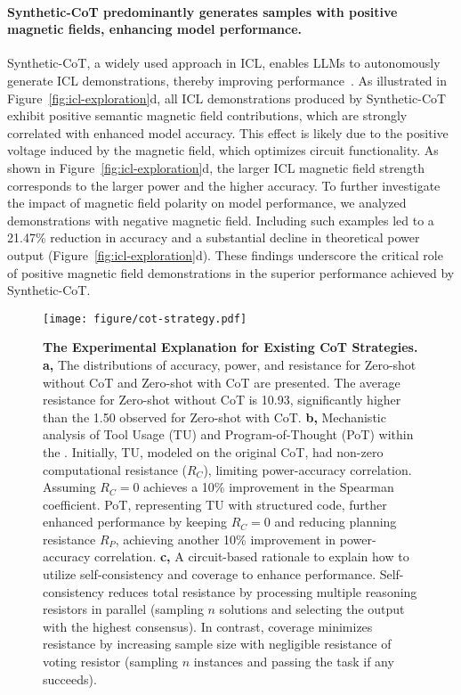 \paragraph{Synthetic-CoT predominantly generates samples with positive magnetic fields, enhancing model performance.}
Synthetic-CoT, a widely used approach in ICL, enables LLMs to autonomously generate ICL demonstrations, thereby improving performance~\citep{shao2023synthetic}. As illustrated in Figure~\ref{fig:icl-exploration}d, all ICL demonstrations produced by Synthetic-CoT exhibit positive semantic magnetic field contributions, which are strongly correlated with enhanced model accuracy. This effect is likely due to the positive voltage induced by the magnetic field, which optimizes circuit functionality. 
As shown in Figure~\ref{fig:icl-exploration}d, the larger ICL magnetic field strength corresponds to the larger power and the higher accuracy.
To further investigate the impact of magnetic field polarity on model performance, we analyzed demonstrations with negative magnetic field. Including such examples led to a 21.47\% reduction in accuracy and a substantial decline in theoretical power output (Figure~\ref{fig:icl-exploration}d). These findings underscore the critical role of positive magnetic field demonstrations in the superior performance achieved by Synthetic-CoT.

\begin{figure*}[t]
    \centering
    \texttt{[image: figure/cot-strategy.pdf]}
    \caption{
        \textbf{The Experimental Explanation for Existing CoT Strategies.}\\
        \textbf{a,}
        The distributions of accuracy, power, and resistance for Zero-shot without CoT and Zero-shot with CoT are presented. The average resistance for Zero-shot without CoT is 10.93, significantly higher than the 1.50 observed for Zero-shot with CoT.
        \textbf{b,}
        Mechanistic analysis of Tool Usage (TU) and Program-of-Thought (PoT) within the \modelname{}. Initially, TU, modeled on the original CoT, had non-zero computational resistance (\(R_C\)), limiting power-accuracy correlation. Assuming \(R_C = 0\) achieves a 10\% improvement in the Spearman coefficient.
        PoT, representing TU with structured code, further enhanced performance by keeping \(R_C=0\) and reducing planning resistance \(R_P\), achieving another 10\% improvement in power-accuracy correlation.
        \textbf{c,}
        A circuit-based rationale to explain how to utilize self-consistency and coverage to enhance performance. Self-consistency reduces total resistance by processing multiple reasoning resistors in parallel (sampling $n$ solutions and selecting the output with the highest consensus). In contrast, coverage minimizes resistance by increasing sample size with negligible resistance of voting resistor (sampling $n$ instances and passing the task if any succeeds).
    }
    \label{fig:cot-strategy}
\end{figure*}


